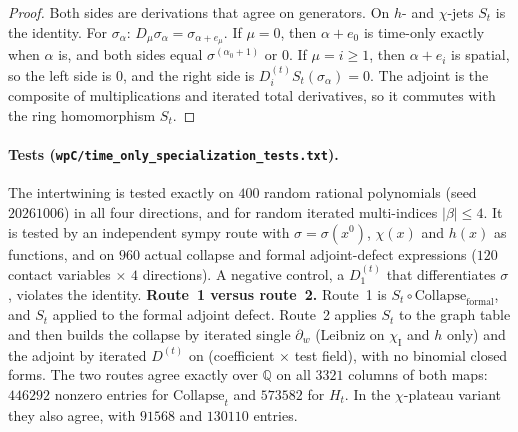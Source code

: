 \documentclass{article}
\theoremstyle{remark}
\newcommand{\chiI}{\chi_{\mathrm I}}
\newcommand{\Coll}{\mathrm{Collapse}}
\begin{document}
\begin{proof}
Both sides are derivations that agree on generators.
On $h$- and $\chi$-jets $S_t$ is the identity.
For $\sigma_\alpha$: $D_\mu\sigma_\alpha=\sigma_{\alpha+e_\mu}$.
If $\mu=0$, then $\alpha+e_0$ is time-only exactly when $\alpha$ is, and both sides equal $\sigma^{(\alpha_0+1)}$ or $0$.
If $\mu=i\ge1$, then $\alpha+e_i$ is spatial, so the left side is $0$, and the right side is $D_i^{(t)}S_t(\sigma_\alpha)=0$.
The adjoint is the composite of multiplications and iterated total derivatives, so it commutes with the ring homomorphism $S_t$.
\end{proof}

\paragraph{Tests (\texttt{wpC/time\_only\_specialization\_tests.txt}).}
The intertwining is tested exactly on $400$ random rational polynomials (seed $20261006$) in all four directions, and for random iterated multi-indices $|\beta|\le4$.
It is tested by an independent sympy route with $\sigma=\sigma(x^0)$, $\chi(x)$ and $h(x)$ as functions, and on $960$ actual collapse and formal adjoint-defect expressions ($120$ contact variables $\times$ $4$ directions).
A negative control, a $D_1^{(t)}$ that differentiates $\sigma$, violates the identity.
\textbf{Route~1 versus route~2.}
Route~1 is $S_t\circ\Coll_{\mathrm{formal}}$, and $S_t$ applied to the formal adjoint defect.
Route~2 applies $S_t$ to the graph table and then builds the collapse by iterated single $\partial_w$ (Leibniz on $\chiI$ and $h$ only) and the adjoint by iterated $D^{(t)}$ on (coefficient $\times$ test field), with no binomial closed forms.
The two routes agree exactly over $\mathbb Q$ on all $3321$ columns of both maps: $446292$ nonzero entries for $\Coll_t$ and $573582$ for $H_t$.
In the $\chi$-plateau variant they also agree, with $91568$ and $130110$ entries.
\end{document}
